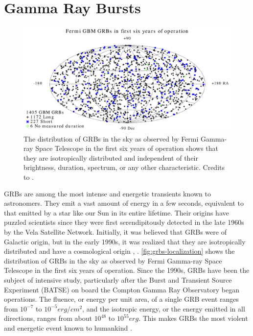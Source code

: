 \section{Gamma Ray Bursts}
\label{s:Gamma-Ray-Bursts}
\begin{figure}[t]
\centering
\includegraphics[width=0.9\linewidth]{figures/introduction/grbs.png}
\caption{The distribution of GRBs in the sky as observed by Fermi Gamma-ray Space Telescope in the first six years of operation shows that they are isotropically distributed and independent of their brightness, duration, spectrum, or any other characteristic. Credits to \cite{fermiwebsite}.}
\label{fig:grbs-localization}
\end{figure}
GRBs are among the most intense and energetic transients known to astronomers. They emit a vast amount of energy in a few seconds, equivalent to that emitted by a star like our Sun in its entire lifetime. Their origins have puzzled scientists since they were first serendipitously detected in the late 1960s by the Vela Satellite Network. Initially, it was believed that GRBs were of Galactic origin, but in the early 1990s, it was realized that they are isotropically distributed and have a cosmological origin \cite{mao_paczynski_1992}, \cite{meegan_fishman_wilson_1992}. \autoref{fig:grbs-localization} shows the distribution of GRBs in the sky as observed by Fermi Gamma-ray Space Telescope in the first six years of operation. Since the 1990s, GRBs have been the subject of intensive study, particularly after the Burst and Transient Source Experiment (BATSE) on board the Compton Gamma Ray Observatory began operations. The fluence, or energy per unit area, of a single GRB event ranges from $10^{-7}$ to $10^{-5} erg/cm^2$, and the isotropic energy, or the energy emitted in all directions, ranges from about $10^{48}$ to $10^{55} erg$. This makes GRBs the most violent and energetic event known to humankind \cite{Kumar_Zhang_2015}.
